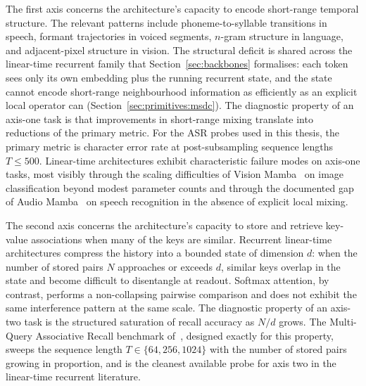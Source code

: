 The first axis concerns the architecture's capacity to encode
short-range temporal structure. The relevant patterns include
phoneme-to-syllable transitions in speech, formant trajectories in
voiced segments, $n$-gram structure in language, and adjacent-pixel
structure in vision. The structural deficit is shared across the
linear-time recurrent family that Section~\ref{sec:backbones}
formalises: each token sees only its own embedding plus the running
recurrent state, and the state cannot encode short-range
neighbourhood information as efficiently as an explicit local
operator can (Section~\ref{sec:primitives:msdc}). The diagnostic
property of an axis-one task is that improvements in short-range
mixing translate into reductions of the primary metric. For the
ASR probes used in this thesis, the primary metric is character error
rate at post-subsampling sequence lengths $T \le 500$. Linear-time
architectures exhibit characteristic failure modes on axis-one tasks,
most visibly through the scaling difficulties of Vision
Mamba~\cite{zhu2024visionmamba} on image classification beyond
modest parameter counts and through the documented gap of Audio
Mamba~\cite{erol2024audiomamba} on speech recognition in the
absence of explicit local mixing.

The second axis concerns the architecture's capacity to store and
retrieve key-value associations when many of the keys are similar.
Recurrent linear-time architectures compress the history into a
bounded state of dimension $d$: when the number of stored pairs $N$
approaches or exceeds $d$, similar keys overlap in the state and
become difficult to disentangle at readout. Softmax attention, by
contrast, performs a non-collapsing pairwise comparison and does not
exhibit the same interference pattern at the same scale. The
diagnostic property of an axis-two task is the structured saturation
of recall accuracy as $N/d$ grows. The Multi-Query Associative
Recall benchmark of~\citet{arora2023zoology}, designed exactly for
this property, sweeps the sequence length $T \in \{64, 256, 1024\}$
with the number of stored pairs growing in proportion, and is the
cleanest available probe for axis two in the linear-time recurrent
literature.


